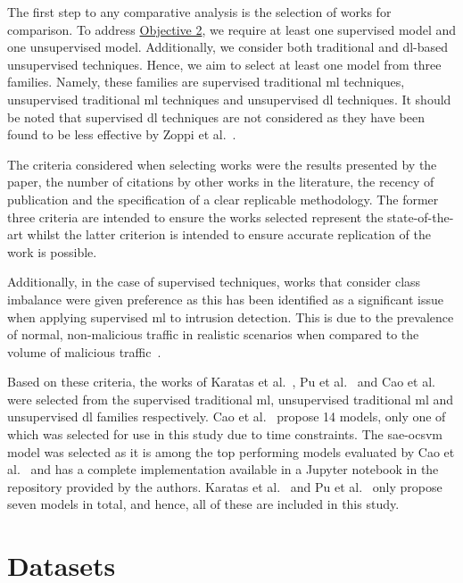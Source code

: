 The first step to any comparative analysis is the selection of works for
comparison. To address \hyperlink{obj}{Objective 2}, we require at least one
supervised model and one unsupervised model. Additionally, we consider both
traditional and \gls{dl}-based unsupervised techniques. Hence, we aim to select
at least one model from three families. Namely, these families are supervised
traditional \gls{ml} techniques, unsupervised traditional \gls{ml} techniques
and unsupervised \gls{dl} techniques. It should be noted that supervised
\gls{dl} techniques are not considered as they have been found to be less
effective by Zoppi et al.~\cite{Zoppi}.

The criteria considered when selecting works were the results presented by the
paper, the number of citations by other works in the literature, the recency of
publication and the specification of a clear replicable methodology. The former
three criteria are intended to ensure the works selected represent the
state-of-the-art whilst the latter criterion is intended to ensure accurate
replication of the work is possible.

Additionally, in the case of supervised techniques, works that consider class
imbalance were given preference as this has been identified as a significant
issue when applying supervised \gls{ml} to intrusion detection. This is due to
the prevalence of normal, non-malicious traffic in realistic scenarios when
compared to the volume of malicious traffic~\cite{imbalance_prob, imbalance}.

Based on these criteria, the works of Karatas et al.~\cite{Karatas}, Pu et
al.~\cite{Pu} and Cao et al.~\cite{Cao} were selected from the supervised
traditional \gls{ml}, unsupervised traditional \gls{ml} and unsupervised
\gls{dl} families respectively. Cao et al.~\cite{Cao} propose 14 models, only
one of which was selected for use in this study due to time constraints. The
\gls{sae}-\gls{ocsvm} model was selected as it is among the top performing
models evaluated by Cao et al.~\cite{Cao} and has a complete implementation
available in a Jupyter notebook in the repository provided by the authors.
Karatas et al.~\cite{Karatas} and Pu et al.~\cite{Pu} only propose seven models
in total, and hence, all of these are included in this study.

\section{Datasets}%
\label{sec:datasets}


